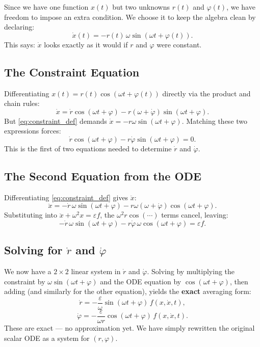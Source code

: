\documentclass{article}
\begin{document}
Since we have one function $x(t)$ but two unknowns $r(t)$ and $\varphi(t)$, we have freedom to
impose an extra condition. We choose it to keep the algebra clean by declaring:
\begin{equation}\label{eq:constraint_def}
    \dot{x}(t) = -r(t)\,\omega\sin(\omega t + \varphi(t)). \tag{$*$}
\end{equation}
This says: $\dot{x}$ looks exactly as it would if $r$ and $\varphi$ were constant.

\subsection{The Constraint Equation}

Differentiating $x(t) = r(t)\cos(\omega t + \varphi(t))$ directly via the product and chain rules:
\[
    \dot{x} = \dot{r}\cos(\omega t + \varphi) - r(\omega + \dot{\varphi})\sin(\omega t + \varphi).
\]
But \eqref{eq:constraint_def} demands $\dot{x} = -r\omega\sin(\omega t + \varphi)$. Matching these
two expressions forces:
\[
    \boxed{\dot{r}\cos(\omega t + \varphi) - r\dot{\varphi}\sin(\omega t + \varphi) = 0.}
    \tag{Constraint}
\]
This is the first of two equations needed to determine $\dot{r}$ and $\dot{\varphi}$.

\subsection{The Second Equation from the ODE}

Differentiating \eqref{eq:constraint_def} gives $\ddot{x}$:
\[
    \ddot{x} = -\dot{r}\,\omega\sin(\omega t + \varphi)
               - r\omega(\omega + \dot{\varphi})\cos(\omega t + \varphi).
\]
Substituting into $\ddot{x} + \omega^2 x = \varepsilon f$, the $\omega^2 r\cos(\cdots)$ terms
cancel, leaving:
\[
    \boxed{-\dot{r}\,\omega\sin(\omega t + \varphi) - r\dot{\varphi}\,\omega\cos(\omega t +
    \varphi) = \varepsilon f.} \tag{ODE eq.}
\]

\subsection{Solving for $\dot{r}$ and $\dot{\varphi}$}

We now have a $2\times 2$ linear system in $\dot{r}$ and $\dot{\varphi}$. Solving by multiplying
the constraint by $\omega\sin(\omega t+\varphi)$ and the ODE equation by $\cos(\omega t+\varphi)$,
then adding (and similarly for the other equation), yields the \textbf{exact} averaging form:
\[
    \dot{r} = -\frac{\varepsilon}{\omega}\sin(\omega t + \varphi)\,f(x, \dot{x}, t),
\]
\[
    \dot{\varphi} = -\frac{\varepsilon}{\omega r}\cos(\omega t + \varphi)\,f(x, \dot{x}, t).
\]
These are exact --- no approximation yet. We have simply rewritten the original scalar ODE as a
system for $(r, \varphi)$.
\end{document}
